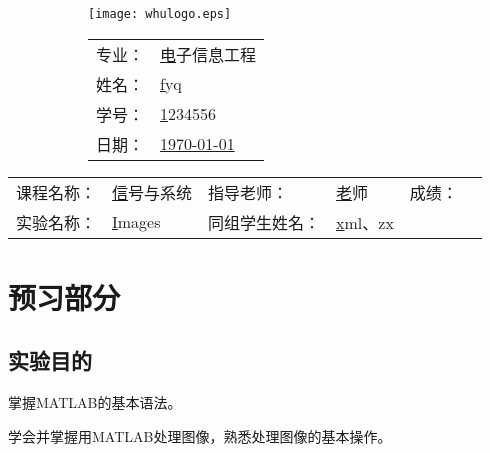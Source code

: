 \documentclass{WHUReport}
\newcommand{\major}{电子信息工程}
\newcommand{\name}{fyq}
\newcommand{\stuid}{1234556}
\newcommand{\newdate}{\today}
\newcommand{\loc}{None}
\newcommand{\course}{信号与系统}
\newcommand{\tutor}{老师}
\newcommand{\grades}{~~~~~~~}
\newcommand{\newtitle}{Images}
\newcommand{\group}{xml、zx}
\begin{document}
\pagecolor [rgb]{0.9, 0.99, 0.9}%
\thispagestyle{empty}
\begin{figure}[h]
    \begin{subfigure}{0.4\linewidth}
      \centerline{\texttt{[image: whulogo.eps]}}
    \end{subfigure}
    \hfill
    \begin{subfigure}{.5\linewidth}
      \raggedleft
      \begin{tabular*}{.8\linewidth}{ll}
        专业： & \underline\major   \\
        姓名： & \underline\name    \\
        学号： & \underline\stuid   \\
        日期： & \underline\newdate \\
      \end{tabular*}
    \end{subfigure}
  \end{figure}
  
  \begin{table}[!htbp]
    \centering
    \begin{tabular*}{0.7\linewidth}{llllll}
      课程名称： & \underline\course   & 指导老师： & \underline\tutor   & 成绩：       &  \underline\grades \\
      实验名称： & \underline\newtitle & 同组学生姓名：& \underline\group
    \end{tabular*}
  \end{table}

  \section{预习部分}
  \subsection{实验目的}
  
  \begin{clause}
    \item 掌握MATLAB的基本语法。
    \item 学会并掌握用MATLAB处理图像，熟悉处理图像的基本操作。
  \end{clause}
\end{document}
